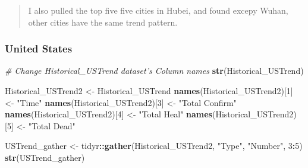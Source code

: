 \documentclass[12pt,]{article}
\newenvironment{Shaded}{\begin{snugshade}}{\end{snugshade}}
\newcommand{\CommentTok}[1]{\textcolor[rgb]{0.56,0.35,0.01}{\textit{#1}}}
\newcommand{\DataTypeTok}[1]{\textcolor[rgb]{0.13,0.29,0.53}{#1}}
\newcommand{\DecValTok}[1]{\textcolor[rgb]{0.00,0.00,0.81}{#1}}
\newcommand{\KeywordTok}[1]{\textcolor[rgb]{0.13,0.29,0.53}{\textbf{#1}}}
\newcommand{\NormalTok}[1]{#1}
\newcommand{\OperatorTok}[1]{\textcolor[rgb]{0.81,0.36,0.00}{\textbf{#1}}}
\newcommand{\StringTok}[1]{\textcolor[rgb]{0.31,0.60,0.02}{#1}}
\begin{document}
\begin{quote}
I also pulled the top five five cities in Hubei, and found excepy Wuhan,
other cities have the same trend pattern.
\end{quote}

\hypertarget{united-states}{%
\subsubsection{United States}\label{united-states}}

\begin{Shaded}
\begin{Highlighting}[]
\CommentTok{# Change Historical_USTrend dataset's Column names}
\KeywordTok{str}\NormalTok{(Historical_USTrend)}

\NormalTok{Historical_USTrend2 <-}\StringTok{ }\NormalTok{Historical_USTrend}
\KeywordTok{names}\NormalTok{(Historical_USTrend2)[}\DecValTok{1}\NormalTok{] <-}\StringTok{ "Time"}
\KeywordTok{names}\NormalTok{(Historical_USTrend2)[}\DecValTok{3}\NormalTok{] <-}\StringTok{ "Total Confirm"}
\KeywordTok{names}\NormalTok{(Historical_USTrend2)[}\DecValTok{4}\NormalTok{] <-}\StringTok{ "Total Heal"}
\KeywordTok{names}\NormalTok{(Historical_USTrend2)[}\DecValTok{5}\NormalTok{] <-}\StringTok{ "Total Dead"}

\NormalTok{USTrend_gather <-}\StringTok{ }\NormalTok{tidyr}\OperatorTok{::}\KeywordTok{gather}\NormalTok{(Historical_USTrend2, }\StringTok{"Type"}\NormalTok{, }\StringTok{"Number"}\NormalTok{, }\DecValTok{3}\OperatorTok{:}\DecValTok{5}\NormalTok{)}
\KeywordTok{str}\NormalTok{(USTrend_gather)}
\end{Highlighting}
\end{Shaded}

\begin{Shaded}
\end{Shaded}
\end{document}
